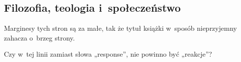 \documentclass[a4paper,11pt]{article}
\begin{document}
\vspace{\spaceTwo}





\subsection{Filozofia, teologia i~społeczeństwo}

\vspace{\spaceTwo}







\start {} Marginesy tych stron są za małe, tak że tytuł książki
w~sposób nieprzyjemny zahacza o~brzeg strony.

\vspace{\spaceFour}





\start {} Czy w~tej linii zamiast słowa „response”, nie powinno
być „reakcje”?

\vspace{\spaceFour}













\newpage

\end{document}
